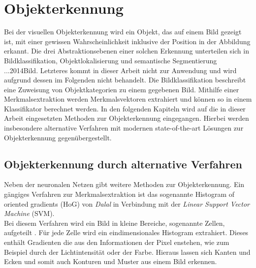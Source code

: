 		
		
		
		
		
	\section{Objekterkennung}
	\label{sec: Objekterkennung}
	Bei der visuellen Objekterkennung wird ein Objekt, das auf einem Bild gezeigt ist, mit einer gewissen Wahrscheinlichkeit inklusive der Position in der Abbildung erkannt. Die drei Abstraktionsebenen einer solchen Erkennung unterteilen sich in Bildklassifikation, Objektlokalisierung und semantische Segmentierung ...2014Bild. Letzteres kommt in dieser Arbeit nicht zur Anwendung und wird aufgrund dessen im Folgenden nicht behandelt. Die Bildklassifikation beschreibt eine Zuweisung von Objektkategorien zu einem gegebenen Bild. Mithilfe einer Merkmalsextraktion werden Merkmalsvektoren extrahiert und können so in einem Klassifikator berechnet werden. In den folgenden Kapiteln wird auf die in dieser Arbeit eingesetzten Methoden zur Objekterkennung eingegangen. Hierbei werden insbesondere alternative Verfahren mit modernen state-of-the-art Lösungen zur Objekterkennung gegenübergestellt.  
	
	
		\subsection{Objekterkennung durch alternative Verfahren}
		\label{subsec: Objekterkennung durch alternative Verfahren}	
		
		
		Neben der neuronalen Netzen gibt weitere Methoden zur Objekterkennung. Ein gängiges Verfahren zur Merkmalsextraktion ist das sogenannte Histogram of oriented gradients (HoG) von \textit{Dalal} in Verbindung mit der \textit{Linear Support Vector Machine} (SVM).\\
		
		Bei diesem Verfahren wird ein Bild in kleine Bereiche, sogenannte Zellen, aufgeteilt \cite{hogsvm}. Für jede Zelle wird ein eindimensionales Histogram extrahiert. Dieses enthält Gradienten die aus den Informationen der Pixel enstehen, wie zum Beispiel durch der Lichtintensität oder der Farbe. Hieraus lassen sich Kanten und Ecken und somit auch Konturen und Muster aus einem Bild erkennen.\\
		
		
		
